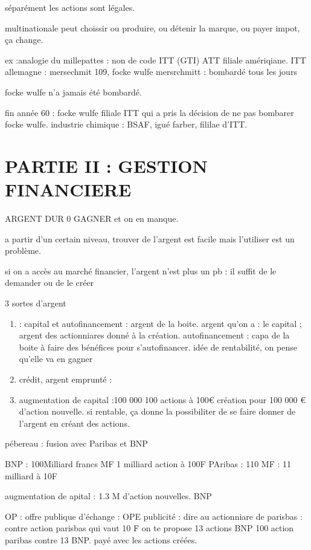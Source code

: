 \documentclass[a4paper,12pt]{article}
\begin{document}
séparément les actions sont légales.

multinationale peut choissir ou produire, ou détenir la marque, ou payer impot, ça change.

ex :analogie du millepattes  : non de code ITT (GTI)  ATT filiale amériqiane.
ITT allemagne : mersechmit 109, focke wulfe
mersrchmitt : bombardé tous les jours

focke wulfe n'a jamais été bombardé.

fin année 60 : focke wulfe filiale ITT
qui a pris la décision de ne pas bombarer focke wulfe.
industrie chimique : BSAF, igué farber, fililae d'ITT.




\section{PARTIE II : GESTION FINANCIERE}
  ARGENT DUR 0 GAGNER et on en manque.
  
  a partir d'un certain niveau, trouver de l'argent est facile mais l'utiliser est un problème.
  
  si on a accès au marché financier, l'argent n'est plus un pb : il suffit de le demander ou de le créer
  
  
 
 3 sortes d'argent



\begin{enumerate}
	\item : capital et autofinancement : argent de la boite.
	 argent qu'on a : le capital ; argent des actionniares donné à la création.
	autofinancement : capa de la boite à faire des bénéfices pour s'autofinancer.
	idée de rentabilité, on pense qu'elle va en gagner
	\item crédit, argent emprunté :
	\item augmentation de capital :100 000 100 actions à 100€
	création pour 100 000 € d'action nouvelle.
	si rentable, ça donne la possibiliter de se faire donner de l'argent en créant des actions.
\end{enumerate}

pébereau : fusion avec Paribas et BNP

BNP : 100Milliard francs MF  1 milliard action à 100F
PAribas : 110 MF   : 11 milliard à 10F


augmentation de apital : 1.3 M d'action nouvelles.
BNP  


OP : offre publique d'échange : OPE
publicité : dire au actionniare de parisbas : contre action parisbas qui vaut 10 F
on te propose 13 actions BNP 100 action paribas contre 13 BNP.
payé avec les actions créées.
\end{document}
